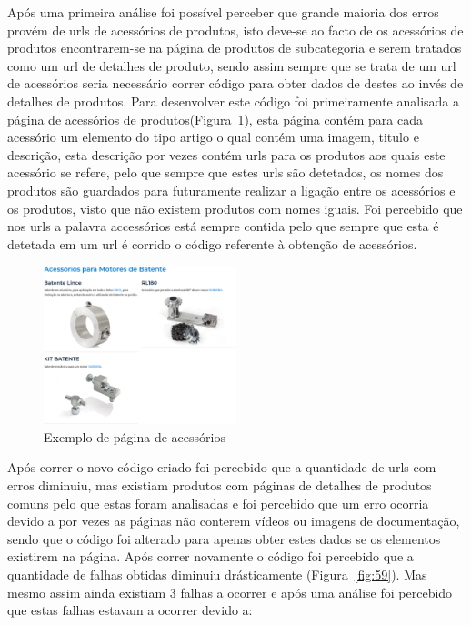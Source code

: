 Após uma primeira análise foi possível perceber que grande maioria dos erros provém de urls de acessórios de produtos, isto deve-se ao facto de os acessórios de produtos encontrarem-se
na página de produtos de subcategoria e serem tratados como um url de detalhes de produto, sendo assim sempre que se trata de um url de acessórios seria necessário correr código para 
obter dados de destes ao invés de detalhes de produtos. Para desenvolver este código foi primeiramente analisada a página de acessórios de produtos(Figura~\ref*{fig:58}), 
esta página contém para cada acessório um elemento do tipo artigo o qual contém uma imagem, titulo e descrição, esta descrição por vezes contém urls para os produtos aos quais este acessório se refere, pelo que sempre que estes
urls são detetados, os nomes dos produtos são guardados para futuramente realizar a ligação entre os acessórios e os produtos, visto que não existem produtos com nomes iguais. Foi percebido que nos urls a palavra accessórios está 
sempre contida pelo que sempre que esta é detetada em um url é corrido o código referente à obtenção de acessórios.

\begin{figure}[htb]
    \centering
    
    \includegraphics[width=0.5\textwidth]{images/implementacao/scraper/pagina_acessorios.png}
    \caption{Exemplo de página de acessórios}
    \label{fig:58}
\end{figure}

\newpage

Após correr o novo código criado foi percebido que a quantidade de urls com erros diminuiu, mas existiam produtos com páginas de detalhes de produtos comuns pelo que estas foram analisadas e foi percebido
que um erro ocorria devido a por vezes as páginas não conterem vídeos ou imagens de documentação, sendo que o código foi alterado para apenas obter estes dados se os elementos existirem na página. 
Após correr novamente o código foi percebido que a quantidade de falhas obtidas diminuiu drásticamente (Figura~\ref{fig:59}). Mas mesmo assim ainda existiam 3 falhas a ocorrer e após uma análise foi percebido que
estas falhas estavam a ocorrer devido a:

